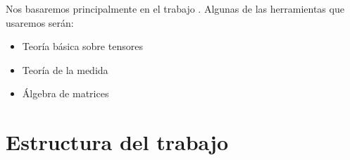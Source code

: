 Nos basaremos principalmente en el trabajo \cite{matematicas:principal}. Algunas de las herramientas que usaremos serán:

\begin{itemize}
    \item Teoría básica sobre tensores
    \item Teoría de la medida
    \item Álgebra de matrices
\end{itemize}

\section{Estructura del trabajo}


\endinput
